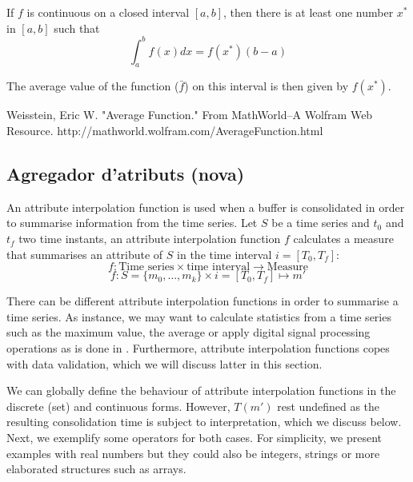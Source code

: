 

If $f$ is continuous on a closed interval $[a,b]$, then there is at least one number $x^*$ in $[a,b]$ such that
$$
\int_a^b f(x)dx = f(x^*)(b-a)
$$

The average value of the function ($\bar f$)  on this interval is then given by  $f(x^*)$.

Weisstein, Eric W. "Average Function." From MathWorld--A Wolfram Web Resource. http://mathworld.wolfram.com/AverageFunction.html






\subsection{Agregador d'atributs (nova)}



An attribute interpolation function is used when a buffer is
consolidated in order to summarise information from the time series.
Let $S$ be a time series and $t_0$ and $t_f$ two time instants, an
attribute interpolation function $f$ calculates a measure that
summarises an attribute of $S$ in the time interval $i=[T_0,T_f]$:
\[
f: \text{Time series} \times \text{time interval} \longrightarrow
\text{Measure}
\]
\[
f: S=\{m_0,\ldots,m_k\} \times i=[T_0,T_f] \mapsto m'
\]

There can be different attribute interpolation functions in order to
summarise a time series. As instance, we may want to calculate
statistics from a time series such as the maximum value, the average
or apply digital signal processing operations as is done in
\cite{zhang11}.  Furthermore, attribute interpolation functions copes
with data validation, which we will discuss latter in this section.

We can globally define the behaviour of attribute interpolation
functions in the discrete (set) and continuous forms. However, $T(m')$
rest undefined as the resulting consolidation time is subject to
interpretation, which we discuss below. Next, we exemplify some
operators for both cases. For simplicity, we present examples with
real numbers but they could also be integers, strings or more
elaborated structures such as arrays.


